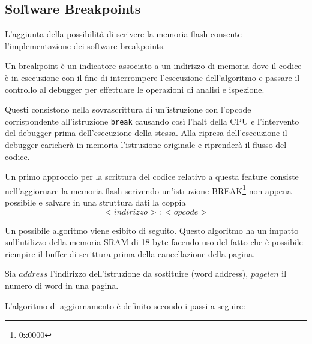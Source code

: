 \subsection{Software Breakpoints}

L'aggiunta della possibilità di scrivere la memoria flash consente l'implementazione dei software breakpoints.

Un breakpoint è un indicatore associato a un indirizzo di memoria dove il codice è in esecuzione con il fine di interrompere l'esecuzione dell'algoritmo e passare il controllo al debugger per effettuare le operazioni di analisi e ispezione.

Questi consistono nella sovrascrittura di un'istruzione con l'opcode corrispondente all'istruzione \texttt{break} causando così l'halt della CPU e l'intervento del debugger prima dell'esecuzione della stessa.
Alla ripresa dell'esecuzione il debugger caricherà in memoria l'istruzione originale e riprenderà il flusso del codice.

Un primo approccio per la scrittura del codice relativo a questa feature consiste nell'aggiornare la memoria flash scrivendo un'istruzione BREAK\footnote{0x0000} non appena possibile e salvare in una struttura dati la coppia \[<indirizzo>:<opcode>\]

Un possibile algoritmo viene esibito di seguito. Questo algoritmo ha un impatto sull'utilizzo della memoria SRAM di 18 byte facendo uso del fatto che è possibile riempire il buffer di scrittura prima della cancellazione della pagina\cite{avr:m328p}.

Sia \(address\) l'indirizzo dell'istruzione da sostituire (word address), \(pagelen\) il numero di word in una pagina.

L'algoritmo di aggiornamento è definito secondo i passi a seguire:

